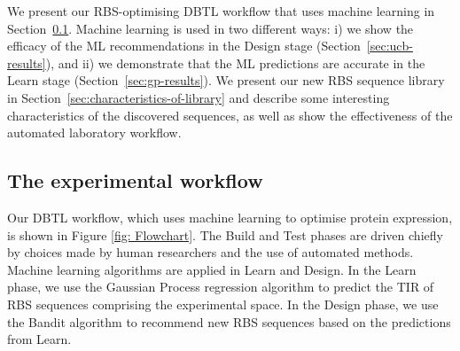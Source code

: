 \documentclass{scrartcl}[2013/05/29]%
\begin{document}
We present our RBS-optimising DBTL workflow that uses machine learning in Section~\ref{sec:dbtl-workflow}.
Machine learning is used in two different ways: i) we show the efficacy of the ML recommendations
in the Design stage (Section~\ref{sec:ucb-results}),
and ii) we demonstrate that the ML predictions are accurate in the Learn stage (Section~\ref{sec:gp-results}).
We present our new RBS sequence library in Section~\ref{sec:characteristics-of-library} and describe some interesting
characteristics of the discovered sequences,
as well as show the effectiveness of the automated laboratory workflow.

\subsection{The experimental workflow}
\label{sec:dbtl-workflow}

Our DBTL workflow, which uses machine learning to optimise protein expression, is shown in Figure \ref{fig: Flowchart}.
The Build and Test phases are driven chiefly by choices made by human researchers and the use of automated methods.
Machine learning algorithms are applied in Learn and Design.
In the Learn phase, we use the Gaussian Process regression algorithm to predict the TIR of RBS sequences comprising the experimental space.
In the Design phase, we use the Bandit algorithm to recommend new RBS sequences based on the predictions from Learn.\\
\end{document}
